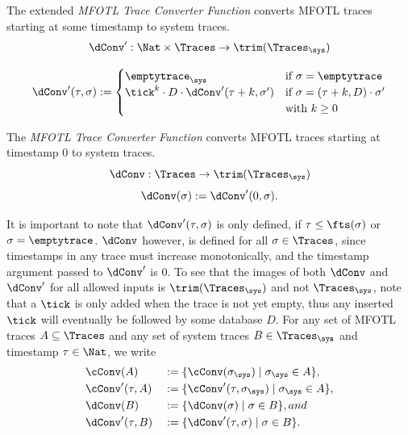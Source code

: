 \begin{definition}
    \label{def:dconv'}
    The extended \emph{MFOTL Trace Converter Function} converts MFOTL
    traces starting at some timestamp to system traces.
    \begin{align*}
        \dConv':
        \Nat \times \Traces \to \trim(\Traces_\sys)
    \end{align*}

    \begin{align*}
        \label{eq:dconv'}
        \dConv'(\tau, \sigma) :=
        \begin{cases}
            \emptytrace_\sys
                &\text{if } \sigma = \emptytrace \\
            \tick^k \cdot D \cdot \dConv'(\tau+k, \sigma')
                &\text{if } \sigma = (\tau+k, D) \cdot \sigma' \\
                &\text{with } k \geq 0
        \end{cases}
    \end{align*}
\end{definition}

\begin{definition}
    \label{def:dconv}
    The \emph{MFOTL Trace Converter Function} converts MFOTL
    traces starting at timestamp $0$ to system traces.
    \begin{equation*}
        \dConv: \Traces \to \trim(\Traces_\sys)
    \end{equation*}
    \begin{equation*}
        \label{eq:dconv}
        \dConv(\sigma) := \dConv'(0, \sigma).
    \end{equation*}
\end{definition}

It is important to note that $\dConv'(\tau, \sigma)$
is only defined, if
$\tau \leq \fts(\sigma)$ or $\sigma = \emptytrace$.
$\dConv$ however, is defined for all $\sigma \in \Traces$,
since timestamps in any trace must increase monotonically,
and the timestamp argument passed to $\dConv'$ is $0$.
To see that the images of both $\dConv$ and $\dConv'$
for all allowed inputs is $\trim(\Traces_\sys)$ and
not $\Traces_\sys$, note that a $\tick$ is only added when
the trace is not yet empty, thus any inserted $\tick$ will
eventually be followed by some database $D$.
For any set of MFOTL traces $A \subseteq \Traces$ and any
set of system traces $B \in \Traces_\sys$ and timestamp
$\tau \in \Nat$, we write
\begin{align*}
    &\cConv(A) &&:= \{ \cConv(\sigma_\sys) \mid \sigma_\sys \in A \}, \\
    &\cConv'(\tau, A) &&:= \{ \cConv'(\tau, \sigma_\sys) \mid \sigma_\sys \in A \}, \\
    &\dConv(B) &&:= \{ \dConv(\sigma) \mid \sigma \in B \}, and \\
    &\dConv'(\tau, B) &&:= \{ \dConv'(\tau, \sigma) \mid \sigma \in B \}. \\
\end{align*}

